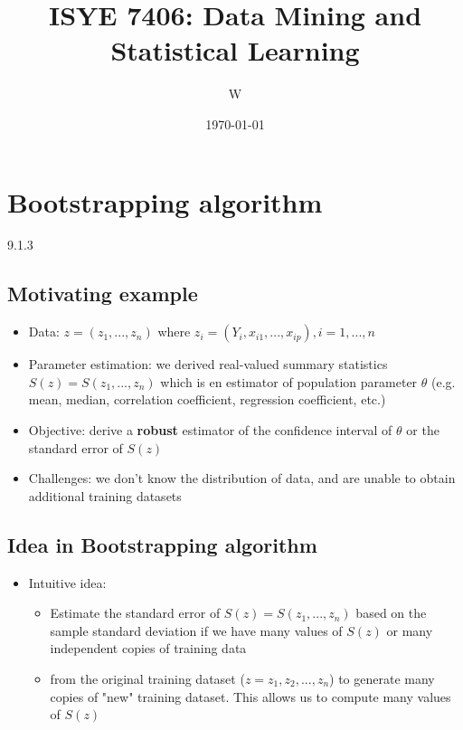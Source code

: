\documentclass[11pt]{article}
\author{W}
\date{\today}
\title{ISYE 7406: Data Mining and Statistical Learning}
\begin{document}
\maketitle
\tableofcontents

\section{Bootstrapping algorithm}
\label{sec:org8d67579}
9.1.3
\subsection{Motivating example}
\label{sec:org8240330}
\begin{itemize}
\item Data: \(z = (z_1, ..., z_n)\) where \(z_i = (Y_i, x_{i1}, ..., x_{ip}), i=1,...,n\)
\item Parameter estimation: we derived real-valued summary statistics
\(S(z) = S(z_1, ..., z_n)\) which is en estimator of population parameter \(\theta\) (e.g. mean, median, correlation coefficient, regression coefficient, etc.)
\item Objective: derive a \textbf{\textbf{robust}} estimator of the confidence interval of \(\theta\) or the standard error of \(S(z)\)
\item Challenges: we don't know the distribution of data, and are unable to obtain additional training datasets
\end{itemize}
\subsection{Idea in Bootstrapping algorithm}
\label{sec:org4df9d32}
\begin{itemize}
\item Intuitive idea:
\begin{itemize}
\item Estimate the standard error of \(S(z) = S(z_1, ..., z_n)\) based on the sample standard deviation if we have many values of \(S(z)\) or many independent copies of training data
\item from the original training dataset (\(z= z_1, z_2, ..., z_n\)) to generate many copies of "new" training dataset. This allows us to compute many values of \(S(z)\)
\end{itemize}
\end{itemize}
\end{document}
